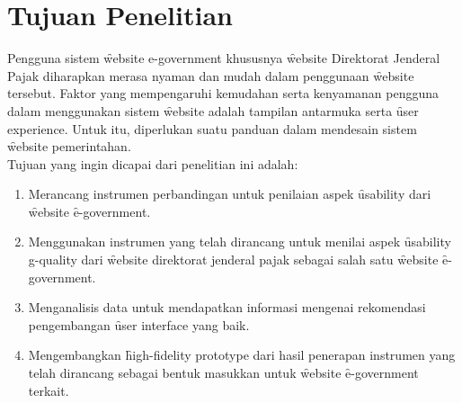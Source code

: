 \section{Tujuan Penelitian}
Pengguna sistem \f{website e-government} khususnya \f{website} Direktorat Jenderal Pajak diharapkan merasa nyaman dan mudah dalam penggunaan \f{website} tersebut. Faktor yang mempengaruhi kemudahan serta kenyamanan pengguna dalam menggunakan sistem \f{website} adalah tampilan antarmuka serta \f{user experience}. Untuk itu, diperlukan suatu panduan dalam mendesain sistem \f{website} pemerintahan.
\newline\\
Tujuan yang ingin dicapai dari penelitian ini adalah:
\begin{enumerate}
\item Merancang instrumen perbandingan untuk penilaian aspek \f{usability} dari \f{website} \f{e-government}.
\item Menggunakan instrumen yang telah dirancang untuk menilai aspek \f{usability g-quality} dari \f{website} direktorat jenderal pajak sebagai salah satu \f{website} \f{e-government}.
\item Menganalisis data untuk mendapatkan informasi mengenai rekomendasi pengembangan \f{user interface} yang baik.
\item Mengembangkan \f{high-fidelity prototype} dari hasil penerapan instrumen yang telah dirancang sebagai bentuk masukkan untuk \f{website} \f{e-government} terkait.
\end{enumerate}
